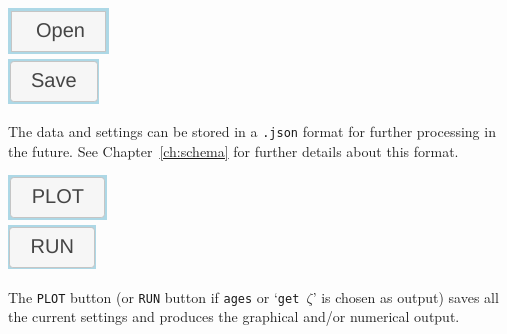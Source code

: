 \begin{refsection}
\noindent\begin{minipage}[t]{.15\textwidth}
\strut\vspace*{-\baselineskip}\newline
\includegraphics[width=.55\textwidth]{../figures/Open.png}\\
\includegraphics[width=.55\textwidth]{../figures/Save.png}\\
\end{minipage}
\begin{minipage}[t]{.85\textwidth}
The data and settings can be stored in a \texttt{.json} format for
further processing in the future. See Chapter~\ref{ch:schema} for
further details about this format.\\
\end{minipage}

\noindent\begin{minipage}[t]{.15\textwidth}
\strut\vspace*{-\baselineskip}\newline
\includegraphics[width=.55\textwidth]{../figures/PLOT.png}\\
\includegraphics[width=.55\textwidth]{../figures/RUN.png}\\
\end{minipage}
\begin{minipage}[t]{.85\textwidth}
The \texttt{PLOT} button (or \texttt{RUN} button if \texttt{ages} or
`\texttt{get $\zeta$}' is chosen as output) saves all the current
settings and produces the graphical and/or numerical output.\\
\end{minipage}


\end{refsection}
